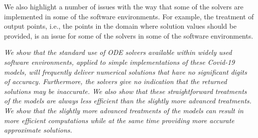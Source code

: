 \documentclass{article}
\begin{document}
We also highlight a number of issues with the way that some of the solvers are implemented
in some of the software environments. For example, the treatment of output points, i.e.,  
the points in the domain where solution values should be provided,
is an issue for some of the solvers in some of the software environments. 

{\it We show that the standard use of ODE solvers available within  widely used software 
environments, applied to simple implementations of these Covid-19 models, will
frequently deliver numerical solutions that have no significant digits of accuracy.
Furthermore, the solvers give no indication that the returned solutions
may be inaccurate. We also show that these straightforward treatments of the models 
are always less efficient than the slightly more advanced treatments.
We show that the slightly more advanced treatments of the models can 
result in more efficient computations while at the same time providing
more accurate approximate solutions.}










\end{document}
